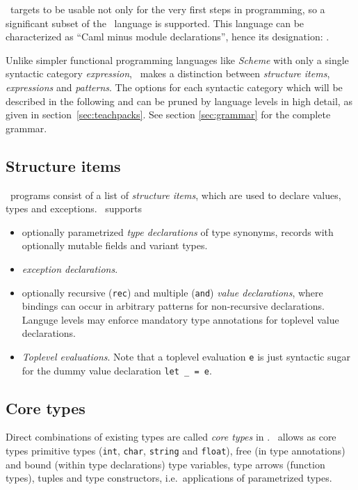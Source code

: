 \easyocaml\ targets to be usable not only for the very first steps in
programming, so a significant subset of the \ocaml\ language is supported.
This language can be characterized as ``Caml minus module declarations'',
hence its designation: \camlm.

Unlike simpler functional programming languages like \textit{Scheme} with only
a single syntactic category \emph{expression}, \ocaml\ makes a distinction
between \emph{structure items}, \emph{expressions} and \emph{patterns}.
The options for each syntactic category which will be described in the
following and can be pruned by language levels in high detail, as given in
section~\ref{sec:teachpacks}.
See section \ref{sec:grammar} for the complete grammar.


\subsection*{Structure items}

\ocaml\ programs consist of a list of \emph{structure items}, which are used to
declare values, types and exceptions.
\easyocaml\ supports
\begin{itemize}
  \item optionally parametrized \emph{type declarations} of type synonyms,
    records with optionally mutable fields and variant types.
  \item \emph{exception declarations}.
  \item optionally recursive (\texttt{rec}) and multiple (\texttt{and})
    \emph{value declarations}, where bindings can occur in arbitrary patterns
    for non-recursive declarations.  Languge levels may enforce mandatory type
    annotations for toplevel value declarations.
  \item \emph{Toplevel evaluations}. Note that a toplevel evaluation 
    \texttt{e} is just syntactic sugar for the dummy value declaration
    \texttt{let \_ = e}.
\end{itemize}

\subsection*{Core types}
Direct combinations of existing types are called \emph{core types} in \ocaml.
\easyocaml\ allows as core types primitive types (\texttt{int}, \texttt{char},
\texttt{string} and \texttt{float}), free (in type annotations) and bound
(within type declarations) type variables, type arrows (function types), tuples
and type constructors, i.e.\ applications of parametrized types.

